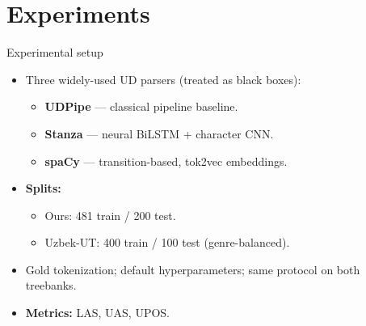\documentclass[10pt,aspectratio=169]{beamer}
\begin{document}
\section{Experiments}
\begin{frame}{Experimental setup}
   \begin{itemize}
      \item Three widely-used UD parsers (treated as black boxes):
      \begin{itemize}
         \item \textbf{UDPipe} — classical pipeline baseline.
         \item \textbf{Stanza} — neural BiLSTM + character CNN.
         \item \textbf{spaCy}  — transition-based, tok2vec embeddings.
      \end{itemize}
      \item \textbf{Splits:}
      \begin{itemize}
         \item Ours: 481 train / 200 test.
         \item Uzbek-UT: 400 train / 100 test (genre-balanced).
      \end{itemize}
      \item Gold tokenization; default hyperparameters; same protocol on both treebanks.
      \item \textbf{Metrics:} LAS, UAS, UPOS.
   \end{itemize}
\end{frame}
\end{document}
